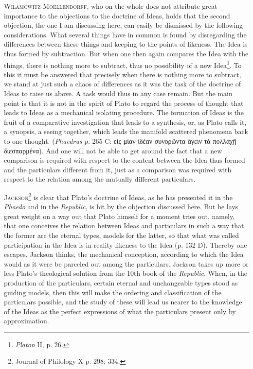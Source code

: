 \documentclass[12pt,a4paper,openany]{book}
\newcommand{\opage}[1]{\marginnote{\footnotesize\textit{[#1]}}}
\begin{document}
\textsc{Wilamowitz-Moellendorff}, who on the whole does not attribute
great importance to the objections to the doctrine of Ideas, holds
that the second objection, the one I am discussing here, can easily be dismissed
by the following considerations. What several things have in common
is found by disregarding the differences between
these things and keeping to the points of likeness. The Idea
is thus formed by subtraction. But when one then again
compares the Idea with the things, there is nothing more
to subtract, thus no possibility of a new Idea\footnote[3]{\textit{Platon} II, p. 26.}. To this
it must be answered that precisely when there is nothing more to subtract,
we stand at just such a chaos of differences as it
was the task of the doctrine of Ideas to raise us above. A task
would thus in any case remain. But the main point
is that it is not in the spirit of Plato to regard the process of thought
that leads to Ideas as a mechanical isolating
\setcounter{footnote}{0}%
\opage{19}procedure. The formation of Ideas is the fruit of a comparative
investigation that leads to a synthesis, or, as
Plato calls it, a synopsis, a seeing together, which leads the
manifold scattered phenomena back to one thought.
(\textit{Phaedrus} p. 265 C: εἰς μίαν ἰδέαν συνορῶντα ἄγειν τὰ πολλαχῇ
διεσπαρμένα). And one will not be able to get around the fact that a
new comparison is required with respect to the content between the
Idea thus formed and the particulars different from it, just as
a comparison was required with respect to the relation
among the mutually different particulars.

\textsc{Jackson}\footnote[1]{Journal of Philology X p. 298; 334.} is clear that Plato’s doctrine of Ideas, as
he has presented it in the \textit{Phaedo} and in the \textit{Republic},
is hit by the objection discussed here. But he lays
great weight on a way out that Plato himself for a moment tries out, %
namely, that one conceives the relation between
Ideas and particulars in such a way that the former are the eternal types, models
for the latter, so that what was called participation in
the Idea is in reality likeness to the Idea (p. 132 D).
Thereby one escapes, Jackson thinks, the mechanical
conception, according to which the Idea would as it were be parceled out
among the particulars. Jackson takes up more or less Plato’s theological
solution from the 10th book of the \textit{Republic}. When, in the production
of the particulars, certain eternal and unchangeable
types stood as guiding models, then this will make the ordering
and classification of the particulars possible, and the study of these will
lead us nearer to the knowledge of the Ideas as the perfect
expressions of what the particulars present only by approximation.
\end{document}
